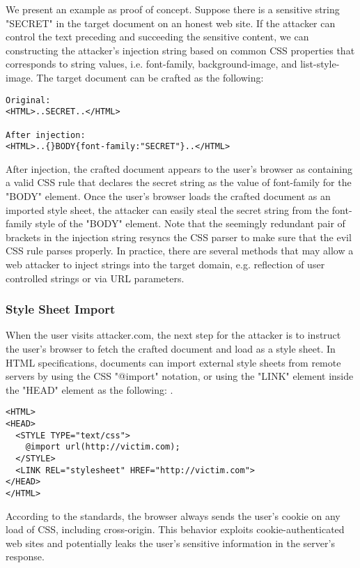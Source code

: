\documentclass{acm_proc_article-sp}
\begin{document}
We present an example as proof of concept. Suppose there is a sensitive string "SECRET" in the target document on an honest web site. If the attacker can control the text preceding and succeeding the sensitive content, we can constructing the attacker's injection string based on common CSS properties that corresponds to string values, i.e. font-family, background-image, and list-style-image. The target document can be crafted as the following:
\begin{verbatim}
Original:
<HTML>..SECRET..</HTML>

After injection:
<HTML>..{}BODY{font-family:"SECRET"}..</HTML>
\end{verbatim}
After injection, the crafted document appears to the user's browser as containing a valid CSS rule that declares the secret string as the value of font-family for the "BODY" element. Once the user's browser loads the crafted document as an imported style sheet, the attacker can easily steal the secret string from the font-family style of the "BODY" element. Note that the seemingly redundant pair of brackets in the injection string resyncs the CSS parser to make sure that the evil CSS rule parses properly. In practice, there are several methods that may allow a web attacker to inject strings into the target domain, e.g. reflection of user controlled strings or via URL parameters.

\subsubsection{Style Sheet Import}
When the user visits attacker.com, the next step for the attacker is to instruct the user's browser to fetch the crafted document and load as a style sheet. In HTML specifications\cite{html}, documents can import external style sheets from remote servers by using the CSS "@import" notation, or using the "LINK" element inside the "HEAD" element as the following: .
\begin{verbatim}
<HTML>
<HEAD>
  <STYLE TYPE="text/css">
    @import url(http://victim.com);
  </STYLE>
  <LINK REL="stylesheet" HREF="http://victim.com">
</HEAD>
</HTML>
\end{verbatim}
According to the standards, the browser always sends the user's cookie on any load of CSS, including cross-origin. This behavior exploits cookie-authenticated web sites and potentially leaks the user's sensitive information in the server's response.
\end{document}
